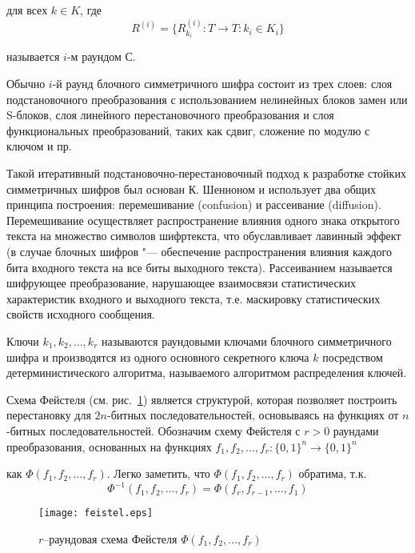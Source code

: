 для всех $k \in K$, где
\begin{equation}R^{(i)} = \{R^{(i)}_{k_i}: T \rightarrow T: k_i \in
K_i\}\end{equation}

называется $i$-м раундом $С$. 

Обычно $i$-й раунд блочного симметричного шифра состоит из трех слоев: слоя
подстановочного преобразования с использованием нелинейных блоков замен или
S-блоков,  слоя линейного перестановочного преобразования и  слоя функциональных
преобразований, таких как сдвиг, сложение по модулю с ключом и пр.

Такой итеративный подстановочно-перестановочный подход к разработке стойких
симметричных шифров был основан К. Шенноном и использует два общих принципа
построения: перемешивание (confusion) и рассеивание (diffusion). Перемешивание
осуществляет распространение влияния одного знака открытого текста на множество
символов шифртекста, что обуславливает лавинный эффект (в случае блочных шифров
"--- обеспечение распространения влияния каждого бита входного текста на все
биты выходного текста). Рассеиванием называется шифрующее преобразование,
нарушающее взаимосвязи статистических характеристик входного и выходного текста,
т.е. маскировку статистических свойств исходного сообщения.

Ключи $k_1, k_2, \ldots, k_r$ называются раундовыми ключами блочного
симметричного шифра и производятся из одного основного секретного ключа $k$
посредством детерминистического алгоритма, называемого алгоритмом распределения
ключей.

Схема Фейстеля (см. рис.~\ref{fig:feistel}) является структурой, которая
позволяет построить перестановку для $2n$-битных последовательностей,
основываясь на функциях от $n$-битных последовательностей. Обозначим схему
Фейстеля с $r > 0$ раундами преобразования, основанных на функциях
$f_1, f_2, \ldots, f_r: \{0, 1\}^n \rightarrow \{0, 1\}^n$

как $\Phi(f_1, f_2, \ldots, f_r)$. Легко заметить, что $\Phi(f_1, f_2, \ldots, f_r)$
обратима, т.к.
\begin{equation}\Phi^{-1}(f_1, f_2, \ldots, f_r) = \Phi(f_r, f_{r-1}, \ldots, f_1)\end{equation}

\begin{figure}
    \centering\texttt{[image: feistel.eps]}
    \caption{$r$–раундовая схема Фейстеля $\Phi(f_1, f_2, \ldots, f_r)$}
    \label{fig:feistel}
\end{figure}

